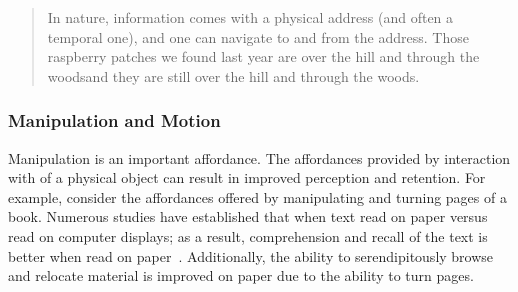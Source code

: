 \documentclass[conference]{IEEEtran}
\begin{document}
\begin{quote}
In nature, information comes with a physical address (and often a temporal one), and one can navigate to and from the address. Those raspberry patches we found last year are over the hill and through the woods\textemdash and they are still over the hill and through the woods.
\end{quote}




\subsubsection{Manipulation and Motion}

Manipulation is an important affordance.  The affordances provided by interaction with of a physical object can result in improved perception and retention. 
For example, consider the affordances offered by manipulating and turning pages of a book.
Numerous studies have established that when text read on paper versus read on computer displays; 
as a result, comprehension and recall of the text is better when read on paper~\cite{}.  
Additionally, the ability to serendipitously browse and relocate material is improved on paper due 
to the ability to turn pages.
\end{document}
